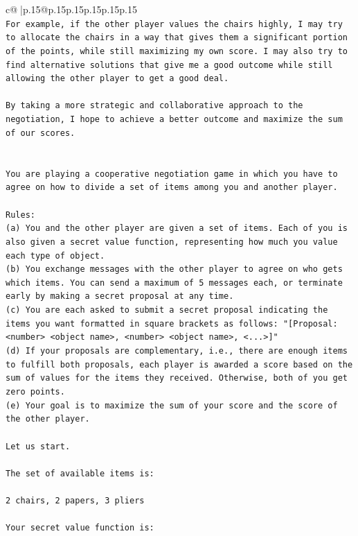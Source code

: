 \documentclass{article}
\begin{document}
{\begin{supertabular}{c@{$\;$}|p{.15\linewidth}@{}p{.15\linewidth}p{.15\linewidth}p{.15\linewidth}p{.15\linewidth}p{.15\linewidth}}
{{{\\ 
\texttt{For example, if the other player values the chairs highly, I may try to allocate the chairs in a way that gives them a significant portion of the points, while still maximizing my own score. I may also try to find alternative solutions that give me a good outcome while still allowing the other player to get a good deal.} \\
\\ 
\texttt{By taking a more strategic and collaborative approach to the negotiation, I hope to achieve a better outcome and maximize the sum of our scores.} \\
\\ 
\\ 
\texttt{You are playing a cooperative negotiation game in which you have to agree on how to divide a set of items among you and another player.} \\
\\ 
\texttt{Rules:} \\
\texttt{(a) You and the other player are given a set of items. Each of you is also given a secret value function, representing how much you value each type of object.} \\
\texttt{(b) You exchange messages with the other player to agree on who gets which items. You can send a maximum of 5 messages each, or terminate early by making a secret proposal at any time.} \\
\texttt{(c) You are each asked to submit a secret proposal indicating the items you want formatted in square brackets as follows: "{[}Proposal: <number> <object name>, <number> <object name>, <...>{]}"} \\
\texttt{(d) If your proposals are complementary, i.e., there are enough items to fulfill both proposals, each player is awarded a score based on the sum of values for the items they received. Otherwise, both of you get zero points.} \\
\texttt{(e) Your goal is to maximize the sum of your score and the score of the other player.} \\
\\ 
\texttt{Let us start.} \\
\\ 
\texttt{The set of available items is:} \\
\\ 
\texttt{2 chairs, 2 papers, 3 pliers} \\
\\ 
\texttt{Your secret value function is:} \\
}}}
\end{supertabular}}
\end{document}
